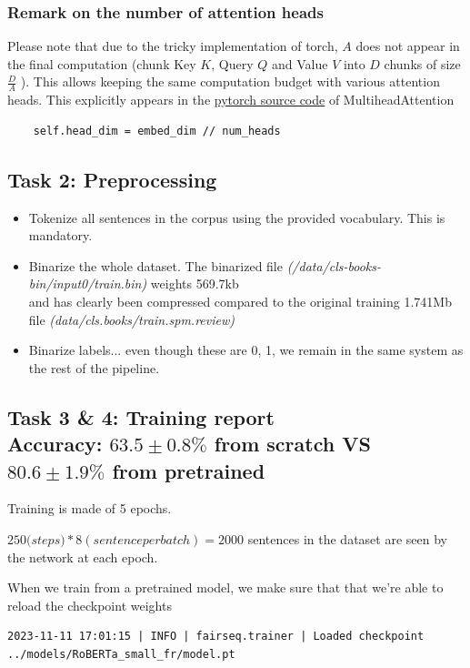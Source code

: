 \documentclass[a4paper]{article}
\begin{document}
\subsubsection*{Remark on the number of attention heads}
Please note that due to the tricky implementation of torch,
$A$ does not appear in the final computation (chunk Key $K$, Query $Q$ and Value $V$ into $D$ chunks of  size $\frac{D}{A}$ ).
This allows keeping the same computation budget with various attention heads.
This explicitly appears in the \href{https://github.com/pytorch/pytorch/blob/main/torch/nn/modules/activation.py#L990}{pytorch source code}
of MultiheadAttention
\begin{verbatim}
    self.head_dim = embed_dim // num_heads
\end{verbatim}

\subsection*{Task 2: Preprocessing}
\begin{itemize}
    \item Tokenize all sentences in the corpus using the provided vocabulary. This is mandatory.
    \item Binarize the whole dataset. The binarized file \textit{(/data/cls-books-bin/input0/train.bin)} weights 569.7kb \\
     and has clearly been compressed compared to the original training 1.741Mb file \textit{(data/cls.books/train.spm.review)}
    \item Binarize labels... even though these are 0, 1, we remain in the same system as the rest of the pipeline.
\end{itemize}



\subsection*{Task 3 \& 4: Training report \\ Accuracy: $63.5\pm0.8\%$ from scratch VS $80.6\pm1.9\%$ from pretrained}
Training is made of 5 epochs.

$250 \textit{(steps)}*8{(sentence per batch)}=2000$ sentences in the dataset are seen by the network at each epoch.

When we train from a pretrained model, we make sure that that we're able to reload the checkpoint weights
\begin{verbatim}
2023-11-11 17:01:15 | INFO | fairseq.trainer | Loaded checkpoint ../models/RoBERTa_small_fr/model.pt
\end{verbatim}
\end{document}
